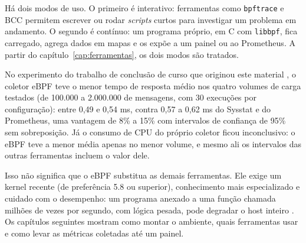 Há dois modos de uso. O primeiro é interativo: ferramentas como \texttt{bpftrace} e BCC permitem escrever ou rodar \textit{scripts} curtos para investigar um problema em andamento. O segundo é contínuo: um programa próprio, em C com \texttt{libbpf}, fica carregado, agrega dados em mapas e os expõe a um painel ou ao Prometheus. A partir do capítulo~\ref{cap:ferramentas}, os dois modos são tratados.

No experimento do trabalho de conclusão de curso que originou este material \cite{alves2026tcc}, o coletor eBPF teve o menor tempo de resposta médio nos quatro volumes de carga testados (de 100.000 a 2.000.000 de mensagens, com 30 execuções por configuração): entre 0,49 e 0,54 ms, contra 0,57 a 0,62 ms do Sysstat e do Prometheus, uma vantagem de 8\% a 15\% com intervalos de confiança de 95\% sem sobreposição. Já o consumo de CPU do próprio coletor ficou inconclusivo: o eBPF teve a menor média apenas no menor volume, e mesmo ali os intervalos das outras ferramentas incluem o valor dele.

Isso não significa que o eBPF substitua as demais ferramentas. Ele exige um kernel recente (de preferência 5.8 ou superior), conhecimento mais especializado e cuidado com o desempenho: um programa anexado a uma função chamada milhões de vezes por segundo, com lógica pesada, pode degradar o host inteiro \cite{linuxkernel2024}. Os capítulos seguintes mostram como montar o ambiente, quais ferramentas usar e como levar as métricas coletadas até um painel.
